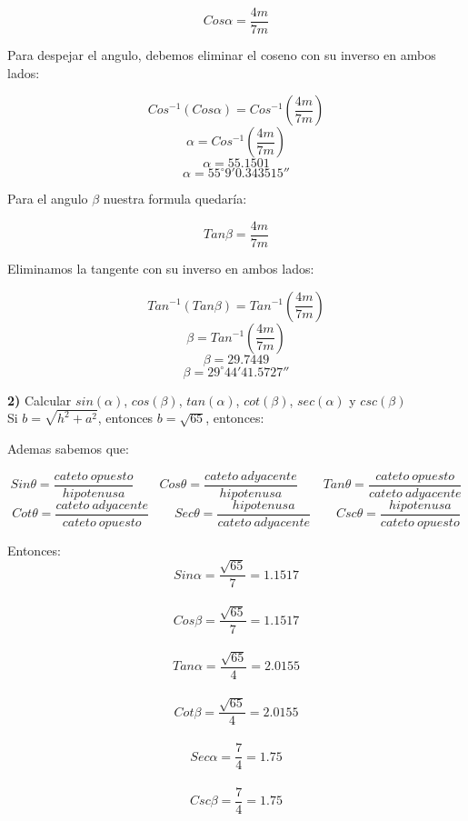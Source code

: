 \documentclass[11pt]{report}
\begin{document}
$$Cos\alpha=\frac{4m}{7m}$$

Para despejar el angulo, debemos eliminar el coseno con su inverso en ambos lados:

$$Cos^{-1}\left(Cos\alpha\right)=Cos^{-1}\left(\frac{4m}{7m}\right)$$
$$\alpha=Cos^{-1}\left(\frac{4m}{7m}\right)$$
$$\alpha=55.1501$$
$$\alpha=55^{\circ}9'0.343515''$$

Para el angulo $\beta$ nuestra formula quedaría:

$$Tan\beta=\frac{4m}{7m}$$

Eliminamos la tangente con su inverso en ambos lados:

$$Tan^{-1}\left(Tan\beta\right)=Tan^{-1}\left(\frac{4m}{7m}\right)$$
$$\beta=Tan^{-1}\left(\frac{4m}{7m}\right)$$
$$\beta=29.7449$$
$$\beta=29^{\circ}44'41.5727''$$

\pagebreak \indent \textbf { 2)} Calcular $sin(\alpha)$, $cos(\beta)$, $tan(\alpha)$, $cot(\beta)$, $sec(\alpha)$ y $csc(\beta)$ \\[2mm]
Si $b=\sqrt{h^2+a^2}$, entonces $b=\sqrt{65}$, entonces:
\begin{center}
\end{center}
Ademas sabemos que:

$$Sin\theta=\frac{cateto\:opuesto}{hipotenusa} \qquad Cos\theta=\frac{cateto\:adyacente}{hipotenusa} \qquad Tan\theta=\frac{cateto\:opuesto}{cateto\:adyacente}$$
$$Cot\theta=\frac{cateto\:adyacente}{cateto\:opuesto} \qquad Sec\theta=\frac{hipotenusa}{cateto\:adyacente} \qquad Csc\theta=\frac{hipotenusa}{cateto\:opuesto}$$

Entonces: \\[2mm]
$$Sin\alpha=\dfrac{\sqrt{65}}{7}=1.1517$$ \\[2mm]
$$Cos\beta=\dfrac{\sqrt{65}}{7}=1.1517$$ \\[2mm]
$$Tan\alpha=\dfrac{\sqrt{65}}{4}=2.0155$$ \\[2mm]
$$Cot\beta=\dfrac{\sqrt{65}}{4}=2.0155$$ \\[2mm]
$$Sec\alpha=\dfrac{7}{4}=1.75$$ \\[2mm]
$$Csc\beta=\dfrac{7}{4}=1.75$$ \\[2mm]
\end{document}
